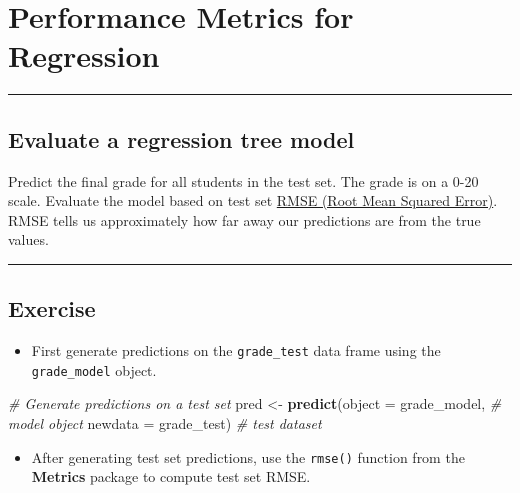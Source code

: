 \documentclass[
]{book}
\newenvironment{Shaded}{\begin{snugshade}}{\end{snugshade}}
\newcommand{\CommentTok}[1]{\textcolor[rgb]{0.56,0.35,0.01}{\textit{#1}}}
\newcommand{\DataTypeTok}[1]{\textcolor[rgb]{0.13,0.29,0.53}{#1}}
\newcommand{\KeywordTok}[1]{\textcolor[rgb]{0.13,0.29,0.53}{\textbf{#1}}}
\newcommand{\NormalTok}[1]{#1}
\newcommand{\StringTok}[1]{\textcolor[rgb]{0.31,0.60,0.02}{#1}}
\providecommand{\tightlist}{%
  \setlength{\itemsep}{0pt}\setlength{\parskip}{0pt}}
\begin{document}
\hypertarget{performance-metrics-for-regression}{%
\section{Performance Metrics for Regression}\label{performance-metrics-for-regression}}

\begin{center}\rule{0.5\linewidth}{0.5pt}\end{center}

\hypertarget{evaluate-a-regression-tree-model}{%
\subsection{Evaluate a regression tree model}\label{evaluate-a-regression-tree-model}}

Predict the final grade for all students in the test set. The grade is on a 0-20 scale. Evaluate the model based on test set \href{https://en.wikipedia.org/wiki/Root-mean-square_deviation}{RMSE (Root Mean Squared Error)}. RMSE tells us approximately how far away our predictions are from the true values.

\begin{center}\rule{0.5\linewidth}{0.5pt}\end{center}

\hypertarget{exercise-6}{%
\subsection*{Exercise}\label{exercise-6}}

\begin{itemize}
\tightlist
\item
  First generate predictions on the \texttt{grade\_test} data frame using the \texttt{grade\_model} object.
\end{itemize}

\begin{Shaded}
\begin{Highlighting}[]
\CommentTok{# Generate predictions on a test set}
\NormalTok{pred <-}\StringTok{ }\KeywordTok{predict}\NormalTok{(}\DataTypeTok{object =}\NormalTok{ grade_model,  }\CommentTok{# model object }
                \DataTypeTok{newdata =}\NormalTok{ grade_test)  }\CommentTok{# test dataset}
\end{Highlighting}
\end{Shaded}

\begin{itemize}
\tightlist
\item
  After generating test set predictions, use the \texttt{rmse()} function from the \textbf{Metrics} package to compute test set RMSE.
\end{itemize}
\end{document}
